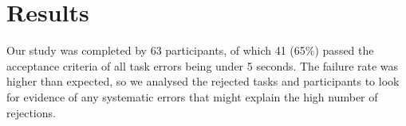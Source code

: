 




\section{Results}\label{sec:vis-results}
Our study was completed by 63 participants, of which 41 (65\%) passed the acceptance criteria of all task errors being
under 5 seconds. The failure rate was higher than expected, so we analysed the rejected tasks and participants to look
for evidence of any systematic errors that might explain the high number of rejections.

